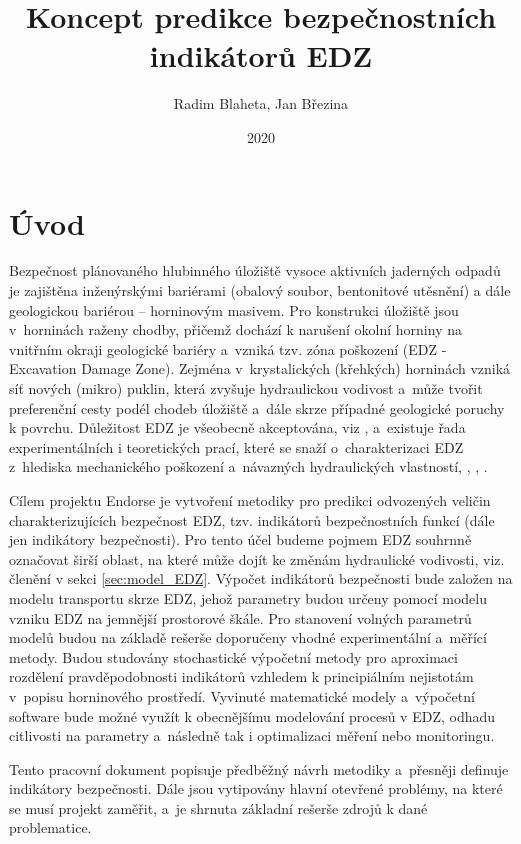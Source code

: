 \documentclass{article}
\title{Koncept predikce bezpečnostních indikátorů EDZ}
\author{Radim Blaheta, Jan Březina}
\date{2020}
\begin{document}
\maketitle


\section{Úvod}
Bezpečnost plánovaného hlubinného úložiště vysoce aktivních jaderných odpadů je zajištěna 
inženýrskými bariérami (obalový soubor, bentonitové utěsnění) a dále geologickou bariérou 
– horninovým masivem. Pro konstrukci úložiště jsou v~horninách raženy chodby, přičemž dochází 
k narušení okolní horniny na vnitřním okraji geologické bariéry a~vzniká tzv. zóna poškození 
(EDZ - Excavation Damage Zone). 
Zejména v~krystalických (křehkých) horninách vzniká síť nových (mikro) puklin, která zvyšuje 
hydraulickou vodivost a~může tvořit preferenční cesty podél 
chodeb úložiště a~dále skrze případné geologické poruchy k povrchu.
Důležitost EDZ je všeobecně
akceptována, viz \cite{Pusch2008}, a~existuje řada experimentálních i teoretických prací, které se snaží o~charakterizaci EDZ z~hlediska mechanického poškození a~návazných hydraulických vlastností, \cite{Lanyon2011}, \cite{Chandler2002}, \cite{Vavro2016}.

Cílem projektu Endorse je vytvoření metodiky pro predikci odvozených veličin charakterizujících 
bezpečnost EDZ, tzv. indikátorů bezpečnostních funkcí (dále jen indikátory bezpečnosti).
Pro tento účel budeme pojmem EDZ souhrnně označovat širší oblast, 
na které může dojít ke změnám hydraulické vodivosti, viz. členění v sekci \ref{sec:model_EDZ}.
Výpočet indikátorů bezpečnosti bude založen na modelu transportu skrze EDZ, 
jehož parametry budou určeny pomocí modelu vzniku EDZ na jemnější prostorové škále. 
Pro stanovení volných parametrů modelů budou na základě rešerše doporučeny vhodné experimentální a~měřící metody.
Budou studovány stochastické výpočetní metody pro aproximaci rozdělení pravděpodobnosti indikátorů
vzhledem k principiálním nejistotám v~popisu horninového prostředí.
Vyvinuté matematické modely a~výpočetní software bude možné využít k obecnějšímu modelování procesů 
v EDZ, odhadu citlivosti na parametry a~následně tak i optimalizaci měření nebo monitoringu.



Tento pracovní dokument popisuje předběžný návrh metodiky a~přesněji definuje indikátory 
bezpečnosti. Dále jsou vytipovány hlavní otevřené problémy, na které se musí projekt zaměřit, a~je 
shrnuta základní rešerše zdrojů k dané problematice. 
\end{document}
